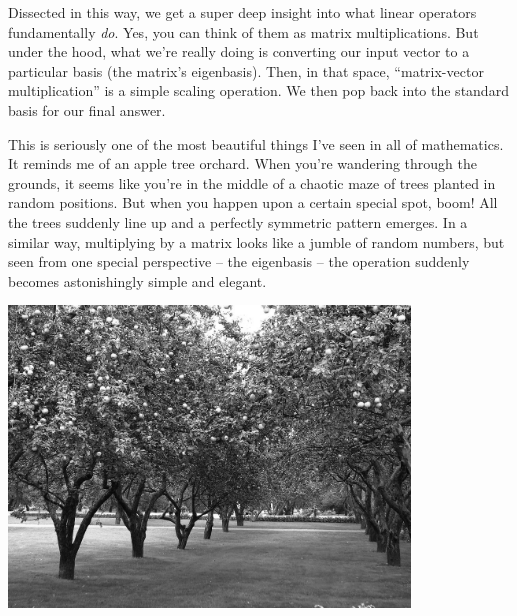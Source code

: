 Dissected in this way, we get a super deep insight into what linear operators
fundamentally \textit{do}. Yes, you can think of them as matrix
multiplications. But under the hood, what we're really doing is converting our
input vector to a particular basis (the matrix's eigenbasis). Then, in that
space, ``matrix-vector multiplication'' is a simple scaling operation. We then
pop back into the standard basis for our final answer.

\smallskip
{}

This is seriously one of the most beautiful things I've seen in all of
mathematics. It reminds me of an apple tree orchard. When you're wandering
through the grounds, it seems like you're in the middle of a chaotic maze of
trees planted in random positions. But when you happen upon a certain special
spot, boom! All the trees suddenly line up and a perfectly symmetric pattern
emerges. In a similar way, multiplying by a matrix looks like a jumble of
random numbers, but seen from one special perspective -- the eigenbasis -- the
operation suddenly becomes astonishingly simple and elegant.

\label{orchard}
\begin{center}
\includegraphics[width=0.8\textwidth]{orchard.jpg}
\end{center}

